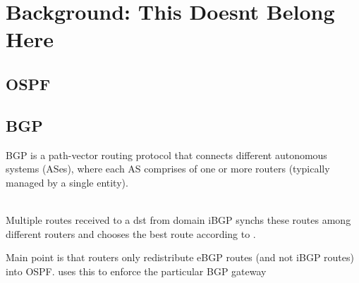 \section{Background: This Doesnt Belong Here}
\subsection{OSPF}

\subsection{BGP}
BGP is a path-vector routing protocol that connects 
different autonomous systems (ASes), where each AS
comprises of one or more routers (typically managed
by a single entity). 

\\
Multiple routes received to a dst from domain
iBGP synchs these routes among different routers
and chooses the best route according to .

Main point is that routers only redistribute
eBGP routes (and not iBGP routes) into OSPF.
\name uses this to enforce the particular
BGP gateway

